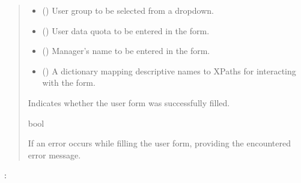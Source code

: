 \documentclass[letterpaper,10pt,english]{sphinxmanual}
\begin{document}
\begin{fulllineitems}
\begin{quote}
\begin{description}
\begin{itemize}
\item {} 
\sphinxAtStartPar
{} () \textendash{} User group to be selected from a dropdown.

\item {} 
\sphinxAtStartPar
{} () \textendash{} User data quota to be entered in the form.

\item {} 
\sphinxAtStartPar
{} () \textendash{} Manager’s name to be entered in the form.

\item {} 
\sphinxAtStartPar
{} () \textendash{} A dictionary mapping descriptive names to XPaths for interacting with the form.

\end{itemize}

\sphinxAtStartPar
Indicates whether the user form was successfully filled.

\sphinxAtStartPar
bool

\sphinxAtStartPar
{} \textendash{} If an error occurs while filling the user form, providing the encountered error message.

\end{description}\end{quote}

\sphinxAtStartPar
{}:


\end{fulllineitems}
\end{document}
